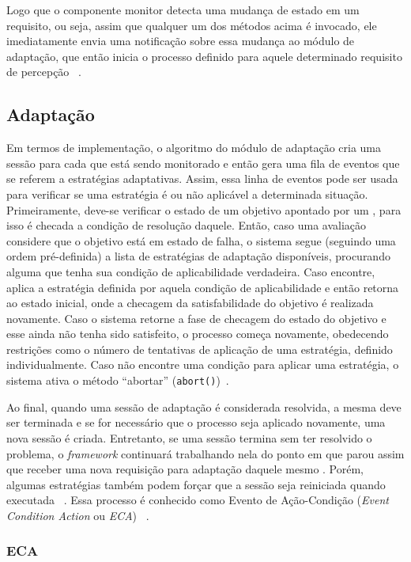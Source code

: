 Logo que o componente monitor detecta uma mudança de estado em um requisito, ou seja, assim que qualquer um dos métodos acima é invocado, ele imediatamente envia uma notificação sobre essa mudança ao módulo de adaptação, que então inicia o processo definido para aquele determinado requisito de percepção ~\cite{tesevitor}.

\subsection{Adaptação}
\label{sec-referencial-zanshin-adaptacao}
Em termos de implementação, o algoritmo do módulo de adaptação cria uma sessão para cada \awreq que está sendo monitorado e então gera uma fila de eventos que se referem a estratégias adaptativas. Assim, essa linha de eventos pode ser usada para verificar se uma estratégia é ou não aplicável a determinada situação. Primeiramente, deve-se verificar o estado de um objetivo apontado por um \awreq, para isso é checada a condição de resolução daquele. Então, caso uma avaliação considere que o objetivo está em estado de falha, o sistema segue (seguindo uma ordem pré-definida) a lista de estratégias de adaptação disponíveis, procurando alguma que tenha sua condição de aplicabilidade verdadeira. Caso encontre, aplica a estratégia definida por aquela condição de aplicabilidade e então retorna ao estado inicial, onde a checagem da satisfabilidade do objetivo é realizada novamente. Caso o sistema retorne a fase de checagem do estado do objetivo e esse ainda não tenha sido satisfeito, o processo começa novamente, obedecendo restrições como o número de tentativas de aplicação de uma estratégia, definido individualmente. Caso não encontre uma condição para aplicar uma estratégia, o sistema ativa o método ``abortar'' (\texttt{abort()})~\cite{souza2013requirements}. 

Ao final, quando uma sessão de adaptação é considerada resolvida, a mesma deve ser terminada e se for necessário que o processo seja aplicado novamente, uma nova sessão é criada. Entretanto, se uma sessão termina sem ter resolvido o problema, o \textit{framework} continuará trabalhando nela do ponto em que parou assim que receber uma nova requisição para adaptação daquele mesmo \awreq. Porém, algumas estratégias também podem forçar que a sessão seja reiniciada quando executada ~\cite{souza2013requirements}. Essa processo é conhecido como Evento de Ação-Condição (\textit{Event Condition Action} ou \textit{ECA}) ~\cite{morin2009models}.

\subsubsection{ECA}
\label{sec-referencial-zanshin-eca}


